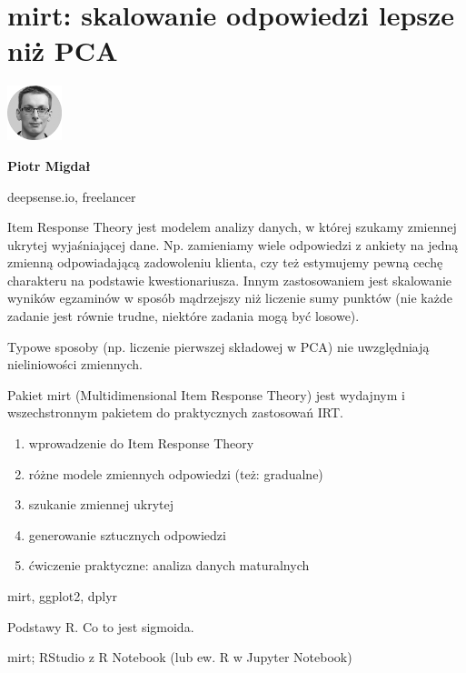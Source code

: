 \documentclass[\main/boa.tex]{subfiles}
\begin{document}
\section{mirt: skalowanie odpowiedzi lepsze niż PCA}
\begin{minipage}[t]{0.915\textwidth}
	\center     
    \includegraphics[width=60px]{img/workshops/czarno_biale/pmigdal_crop.png} 
\end{minipage}

\begin{minipage}{0.915\textwidth}
\centering
{\bf {} Piotr Migdał}
\end{minipage}

\vskip 0.3cm

\begin{affiliations}
\begin{minipage}{0.915\textwidth}
\centering
\large deepsense.io, freelancer  \\[2pt]
\end{minipage}
\end{affiliations}

\vskip 0.8cm

\opiswarsztatu Item Response Theory jest modelem analizy danych, w której szukamy zmiennej ukrytej wyjaśniającej dane. Np. zamieniamy wiele odpowiedzi z ankiety na jedną zmienną odpowiadającą zadowoleniu klienta, czy też estymujemy pewną cechę charakteru na podstawie kwestionariusza. Innym zastosowaniem jest skalowanie wyników egzaminów w sposób mądrzejszy niż liczenie sumy punktów (nie każde zadanie jest równie trudne, niektóre zadania mogą być losowe).

Typowe sposoby (np. liczenie pierwszej składowej w PCA) nie uwzględniają nieliniowości zmiennych.

Pakiet mirt (Multidimensional Item Response Theory) jest wydajnym i wszechstronnym pakietem do praktycznych zastosowań IRT.

\planwarsztatu
\begin{enumerate}
\item wprowadzenie do Item Response Theory
\item różne modele zmiennych odpowiedzi (też: gradualne)
\item szukanie zmiennej ukrytej
\item generowanie sztucznych odpowiedzi
\item ćwiczenie praktyczne: analiza danych maturalnych
\end{enumerate}	 

\pakiety mirt, ggplot2, dplyr

\umiejetnosci Podstawy R. Co to jest sigmoida.

\wymagania mirt; RStudio z R Notebook (lub ew. R w Jupyter Notebook)
\end{document}
